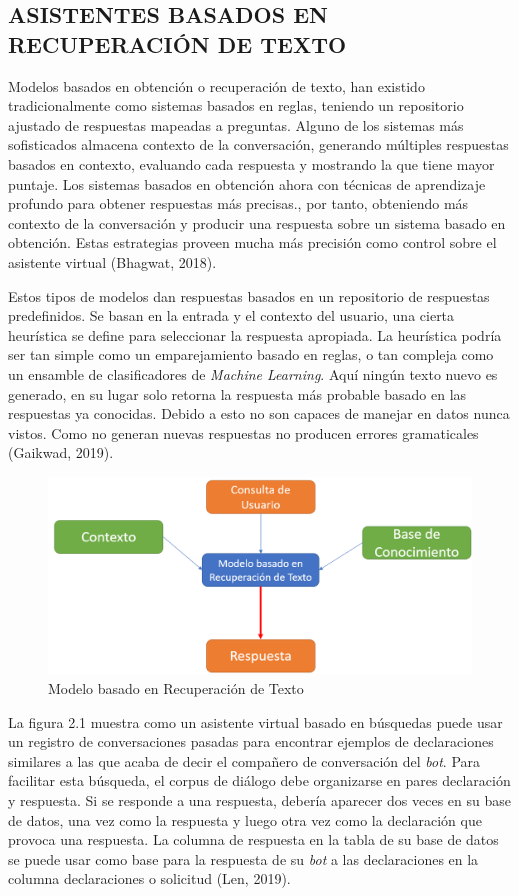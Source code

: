 \documentclass[letter, openright, 12pt]{book}
\begin{document}
\subsection{ASISTENTES BASADOS EN RECUPERACIÓN DE TEXTO}
Modelos basados en obtención o recuperación de texto, han existido tradicionalmente como sistemas basados en reglas, teniendo un repositorio ajustado de respuestas mapeadas a preguntas. Alguno de los sistemas más sofisticados almacena contexto de la conversación, generando múltiples respuestas basados en contexto, evaluando cada respuesta y mostrando la que tiene mayor puntaje. Los sistemas basados en obtención ahora con técnicas de aprendizaje profundo para obtener respuestas más precisas., por tanto, obteniendo más contexto de la conversación y producir una respuesta sobre un sistema basado en obtención. Estas estrategias proveen mucha más precisión como control sobre el asistente virtual (Bhagwat, 2018).\par
Estos tipos de modelos dan respuestas basados en un repositorio de respuestas predefinidos. Se basan en la entrada y el contexto del usuario, una cierta heurística se define para seleccionar la respuesta apropiada. La heurística podría ser tan simple como un emparejamiento basado en reglas, o tan compleja como un ensamble de clasificadores de \textit{Machine Learning}. Aquí ningún texto nuevo es generado, en su lugar solo retorna la respuesta más probable basado en las respuestas ya conocidas. Debido a esto no son capaces de manejar en datos nunca vistos. Como no generan nuevas respuestas no producen errores gramaticales (Gaikwad, 2019). 

\begin{figure}[!ht]
\includegraphics[width=1\textwidth]{figura2_1}
\caption{Modelo basado en Recuperación de Texto}
\label{tab:figura2_1} 
\end{figure}

La figura 2.1 muestra como un asistente virtual basado en búsquedas puede usar un registro de conversaciones pasadas para encontrar ejemplos de declaraciones similares a las que acaba de decir el compañero de conversación del \textit{bot}. Para facilitar esta búsqueda, el corpus de diálogo debe organizarse en pares declaración y respuesta. Si se responde a una respuesta, debería aparecer dos veces en su base de datos, una vez como la respuesta y luego otra vez como la declaración que provoca una respuesta. La columna de respuesta en la tabla de su base de datos se puede usar como base para la respuesta de su \textit{bot} a las declaraciones en la columna declaraciones o solicitud (Len, 2019).
\end{document}
